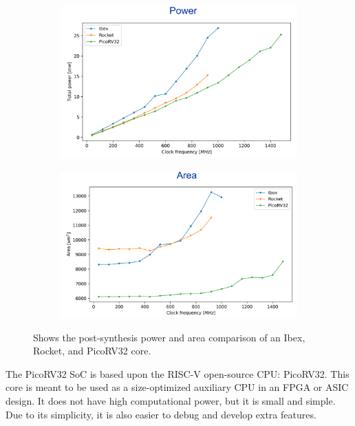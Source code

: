 \begin{figure}[H]
    \centering
    \begin{subfigure}[b]{0.49\textwidth}
        \centering
        \includegraphics[width=\textwidth]{subfiles/imgs/cpuComparePower.png}
        \caption{}
        \label{fig:cpuComparePower}
    \end{subfigure}
    \hfill
    \begin{subfigure}[b]{0.49\textwidth}
        \centering
        \includegraphics[width=\textwidth]{subfiles/imgs/cpuCompareArea.png}
        \caption{}
        \label{fig:cpuCompareArea}
    \end{subfigure}
    \hfill
    \caption{Shows the post-synthesis power and area comparison of an Ibex, Rocket, and PicoRV32 core.}
    \label{fig:CpuComparison}
\end{figure}

The PicoRV32 SoC is based upon the RISC-V open-source CPU: PicoRV32. This core is meant to be used as a size-optimized auxiliary CPU in an FPGA or ASIC design. It does not have high computational power, but it is small and simple. Due to its simplicity, it is also easier to debug and develop extra features. 

